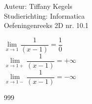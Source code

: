 \documentclass[a4paper]{article}
\begin{document}
  
\noindent \large Auteur: Tiffany Kegels \\
\noindent \large Studierichting: Informatica\\
\noindent \large Oefeningenreeks 2D nr. 10.1\\

\medskip

\normalsize

$\lim\limits_{x \rightarrow 1} \dfrac{1}{(x-1)} = \dfrac{1}{0}$\\

$\lim\limits_{x \rightarrow 1+} \dfrac{1}{(x-1)} = +\infty$\\

$\lim\limits_{x \rightarrow 1-} \dfrac{1}{(x-1)} = -\infty$


\begin{thebibliography}{999}

\end{thebibliography}
\end{document}
